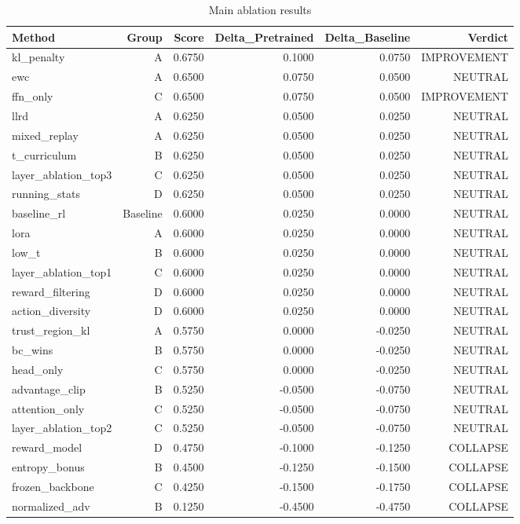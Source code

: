\begin{table}[htbp]
\centering
\caption{Main ablation results}
\label{tab:main-results}
\begin{tabular}{lrrrrr}
\toprule
\textbf{Method} & \textbf{Group} & \textbf{Score} & \textbf{Delta\_Pretrained} & \textbf{Delta\_Baseline} & \textbf{Verdict} \\
\midrule
kl\_penalty & A & 0.6750 & 0.1000 & 0.0750 & IMPROVEMENT \\
ewc & A & 0.6500 & 0.0750 & 0.0500 & NEUTRAL \\
ffn\_only & C & 0.6500 & 0.0750 & 0.0500 & IMPROVEMENT \\
llrd & A & 0.6250 & 0.0500 & 0.0250 & NEUTRAL \\
mixed\_replay & A & 0.6250 & 0.0500 & 0.0250 & NEUTRAL \\
t\_curriculum & B & 0.6250 & 0.0500 & 0.0250 & NEUTRAL \\
layer\_ablation\_top3 & C & 0.6250 & 0.0500 & 0.0250 & NEUTRAL \\
running\_stats & D & 0.6250 & 0.0500 & 0.0250 & NEUTRAL \\
baseline\_rl & Baseline & 0.6000 & 0.0250 & 0.0000 & NEUTRAL \\
lora & A & 0.6000 & 0.0250 & 0.0000 & NEUTRAL \\
low\_t & B & 0.6000 & 0.0250 & 0.0000 & NEUTRAL \\
layer\_ablation\_top1 & C & 0.6000 & 0.0250 & 0.0000 & NEUTRAL \\
reward\_filtering & D & 0.6000 & 0.0250 & 0.0000 & NEUTRAL \\
action\_diversity & D & 0.6000 & 0.0250 & 0.0000 & NEUTRAL \\
trust\_region\_kl & A & 0.5750 & 0.0000 & -0.0250 & NEUTRAL \\
bc\_wins & B & 0.5750 & 0.0000 & -0.0250 & NEUTRAL \\
head\_only & C & 0.5750 & 0.0000 & -0.0250 & NEUTRAL \\
advantage\_clip & B & 0.5250 & -0.0500 & -0.0750 & NEUTRAL \\
attention\_only & C & 0.5250 & -0.0500 & -0.0750 & NEUTRAL \\
layer\_ablation\_top2 & C & 0.5250 & -0.0500 & -0.0750 & NEUTRAL \\
reward\_model & D & 0.4750 & -0.1000 & -0.1250 & COLLAPSE \\
entropy\_bonus & B & 0.4500 & -0.1250 & -0.1500 & COLLAPSE \\
frozen\_backbone & C & 0.4250 & -0.1500 & -0.1750 & COLLAPSE \\
normalized\_adv & B & 0.1250 & -0.4500 & -0.4750 & COLLAPSE \\
\bottomrule
\end{tabular}
\end{table}